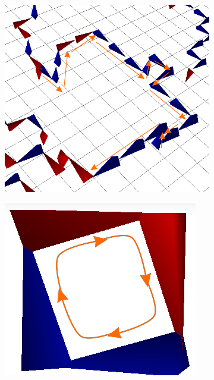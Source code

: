 \begin{figure}[htb!]
\centering
    \begin{subfigure}[b]{0.3\textwidth}
	\includegraphics[width=\textwidth]{./plaqt1_line.png}
    \end{subfigure}\hfill
    \begin{subfigure}[b]{0.3\textwidth}
    \includegraphics[width=\textwidth]{./plaqt1_loop.png}

\end{subfigure}
\end{figure}
